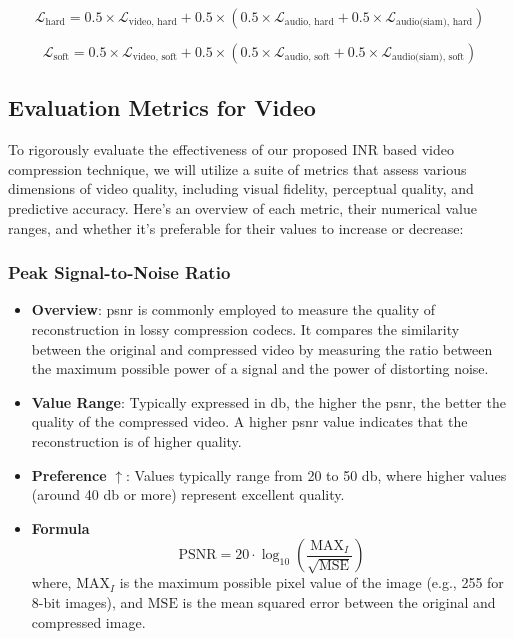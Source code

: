     \begin{equation}
        \mathcal{L}_{\text{hard}} = 0.5 \times \mathcal{L}_{\text{video, hard}} + 0.5 \times \left( 0.5 \times \mathcal{L}_{\text{audio, hard}} + 0.5 \times \mathcal{L}_{\text{audio(siam), hard}} \right)
    \end{equation}

    \begin{equation}
        \mathcal{L}_{\text{soft}} = 0.5 \times \mathcal{L}_{\text{video, soft}} + 0.5 \times \left( 0.5 \times \mathcal{L}_{\text{audio, soft}} + 0.5 \times \mathcal{L}_{\text{audio(siam), soft}} \right)
    \end{equation}

    
    \subsection{Evaluation Metrics for Video}
        To rigorously evaluate the effectiveness of our proposed INR based video compression technique, we will utilize a suite of metrics that assess various dimensions of video quality, including visual fidelity, perceptual quality, and predictive accuracy. Here's an overview of each metric, their numerical value ranges, and whether it's preferable for their values to increase or decrease:
        \subsubsection{Peak Signal-to-Noise Ratio}
            \begin{itemize}
                \item \textbf{Overview}: \gls{psnr} is commonly employed to measure the quality of reconstruction in lossy compression \gls{codec}s. It compares the similarity between the original and compressed video by measuring the ratio between the maximum possible power of a signal and the power of distorting noise.
                \item \textbf{Value Range}: Typically expressed in \gls{db}, the higher the \gls{psnr}, the better the quality of the compressed video. A higher \gls{psnr} value indicates that the reconstruction is of higher quality.
                \item \textbf{Preference} $\uparrow$: Values typically range from 20 to 50 \gls{db}, where higher values (around 40 \gls{db} or more) represent excellent quality.
                \item \textbf{Formula}
                \begin{equation}\label{eqn:PSNR}
                    \text{PSNR} = 20 \cdot \log_{10}\left(\frac{{\text{MAX}_I}}{\sqrt{\text{MSE}}}\right)
                \end{equation}
                where, $\text{MAX}_I$ is the maximum possible pixel value of the image (e.g., 255 for 8-bit images), and $\text{MSE}$ is the mean squared error between the original and compressed image.
               \end{itemize} 

